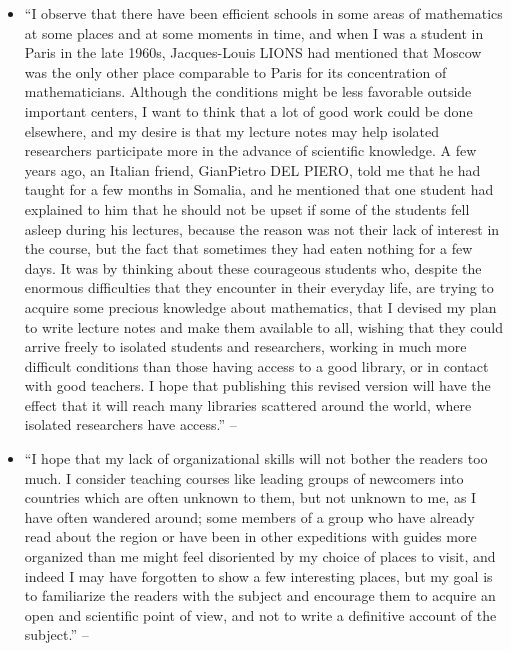 \documentclass[oneside]{book}
\numberwithin{equation}{section}
\begin{document}
\begin{enumerate}
\begin{itemize}
		\item ``I observe that there have been efficient schools in some areas of mathematics at some places and at some moments in time, and when I was a student in Paris in the late 1960s, Jacques-Louis LIONS had mentioned that Moscow was the only other place comparable to Paris for its concentration of mathematicians. Although the conditions might be less favorable outside important centers, I want to think that a lot of good work could be done elsewhere, and my desire is that my lecture notes may help isolated researchers participate more in the advance of scientific knowledge. A few years ago, an Italian friend, GianPietro DEL PIERO, told me that he had taught for a few months in Somalia, and he mentioned that one student had explained to him that he should not be upset if some of the students fell asleep during his lectures, because the reason was not their lack of interest in the course, but the fact that sometimes they had eaten nothing for a few days. It was by thinking about these courageous students who, despite the enormous difficulties that they encounter in their everyday life, are trying to acquire some precious knowledge about mathematics, that I devised my plan to write lecture notes and make them available to all, wishing that they could arrive freely to isolated students and researchers, working in much more difficult conditions than those having access to a good library, or in contact with good teachers. I hope that publishing this revised version will have the effect that it will reach many libraries scattered around the world, where isolated researchers have access.'' -- \cite[Preface, p. xi]{Tartar2006}
		\item ``I hope that my lack of organizational skills will not bother the readers too much. I consider teaching courses like leading groups of newcomers into countries which are often unknown to them, but not unknown to me, as I have often wandered around; some members of a group who have already read about the region or have been in other expeditions with guides more organized than me might feel disoriented by my choice of places to visit, and indeed I may have forgotten to show a few interesting places, but my goal is to familiarize the readers with the subject and encourage them to acquire an open and scientific point of view, and not to write a definitive account of the subject.'' -- \cite[Preface, p. xii]{Tartar2006}

\end{itemize}
\end{enumerate}
\end{document}
